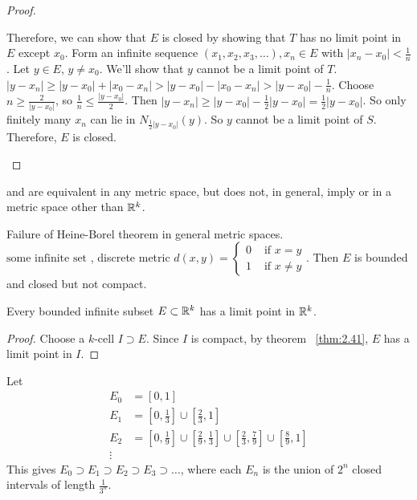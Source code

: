 \begin{theorem}
\begin{proof}
\begin{description}
			      Therefore, we can show that $E$ is closed by showing that $T$ has no limit point in $E$ except $x_0$.
			      Form an infinite sequence $(x_1,x_2, x_3, \ldots ), x_n \in E$ with $|x_n -x_0|<\frac{1}{n}$.
			      Let $y \in E$, $y\neq x_0$. We'll show that $y$ cannot be a limit point of $T$.
			      $|y-x_n|\ge |y-x_0|+|x_0-x_n|> |y-x_0|-|x_0-x_n| >|y-x_0|-\frac{1}{n}$. Choose $n\ge \frac{2}{|y-x_0|}$, so $\frac{1}{n}\le \frac{|y-x_0|}{2}$. Then $|y-x_n|\ge |y-x_0|-\frac{1}{2}|y-x_0|=\frac{1}{2}|y-x_0|$. So only finitely many $x_{n}$ can lie in $N_{\frac{1}{2}|y-x_0|}(y)$.
			      So $y$ cannot be a limit point of $S$. Therefore, $E$ is closed.
		\end{description}
	\end{proof}
	\begin{remark}
		 and  are equivalent in any metric space, but  does not, in general, imply  or  in a metric space other than $\mathbb{R}^{k}$.
	\end{remark}

\end{theorem}

\begin{example}
	Failure of Heine-Borel theorem in general metric spaces.\\
	$\text{some infinite set}$ , discrete metric $d(x,y)=
		\begin{cases}
			0 & \text{ if } x=y     \\
			1 & \text{ if } x\neq y
		\end{cases}
	$.
	Then $E$ is bounded and closed but not compact.
\end{example}

\begin{theorem}
	\label{thm:2.42}
	Every bounded infinite subset $E \subset \mathbb{R} ^{k}$ has a limit point in $\mathbb{R} ^{k}$.
	\begin{proof}
		Choose a $k$-cell $I \supset E$.
		Since $I$ is compact, by theorem ~\ref{thm:2.41}, $E$ has a limit point in $I$.
	\end{proof}
\end{theorem}
\begin{example}
	\label{eg:2.42}
	Let
	\begin{align}
		E_0 & =[0,1]                                                                                               \\
		E_1 & =[0,\frac{1}{3}] \cup [\frac{2}{3},1]                                                                \\
		E_2 & = [0,\frac{1}{9}] \cup [\frac{2}{9},\frac{1}{3}] \cup [\frac{2}{3},\frac{7}{9}] \cup [\frac{8}{9},1] \\
		\vdots
	\end{align}
	This gives $E_0 \supset E_1 \supset E_2 \supset E_3 \supset \ldots $, where each $E_n$ is the union of $2^{n}$ closed intervals of length $\frac{1}{3^{n}}$.
\end{example}

